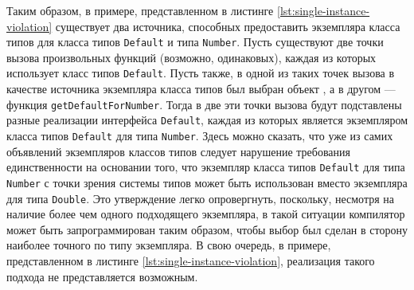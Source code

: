 Таким образом, в примере, представленном в листинге \ref{lst:single-instance-violation} существует два источника, способных предоставить экземпляра класса типов для класса типов \lstinline{Default} и типа \lstinline{Number}. Пусть существуют две точки вызова произвольных функций (возможно, одинаковых), каждая из которых использует класс типов \lstinline{Default}. Пусть также, в одной из таких точек вызова в качестве источника экземпляра класса типов был выбран объект , а в другом --- функция \lstinline{getDefaultForNumber}. Тогда в две эти точки вызова будут подставлены разные реализации интерфейса \lstinline{Default}, каждая из которых является экземпляром класса типов \lstinline{Default} для типа \lstinline{Number}. Здесь можно сказать, что уже из самих объявлений экземпляров классов типов следует нарушение требования единственности на основании того, что экземпляр класса типов \lstinline{Default} для типа \lstinline{Number} с точки зрения системы типов может быть использован вместо экземпляра для типа \lstinline{Double}. Это утверждение легко опровергнуть, поскольку, несмотря на наличие более чем одного подходящего экземпляра, в такой ситуации компилятор может быть запрограммирован таким образом, чтобы выбор был сделан в сторону наиболее точного по типу экземпляра. В свою очередь, в примере, представленном в листинге \ref{lst:single-instance-violation}, реализация такого подхода не представляется возможным.   

